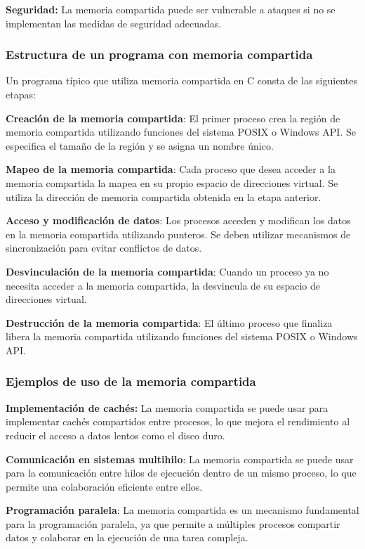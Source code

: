 \textbf{Seguridad:} La memoria compartida puede ser vulnerable a ataques si no se implementan las medidas de seguridad adecuadas.

\subsubsection{Estructura de un programa con memoria compartida}

Un programa típico que utiliza memoria compartida en C consta de las siguientes etapas:

\textbf{Creación de la memoria compartida}: El primer proceso crea la región de memoria compartida utilizando funciones del sistema POSIX o Windows API. Se especifica el tamaño de la región y se asigna un nombre único.

\textbf{Mapeo de la memoria compartida}: Cada proceso que desea acceder a la memoria compartida la mapea en su propio espacio de direcciones virtual. Se utiliza la dirección de memoria compartida obtenida en la etapa anterior.

\textbf{Acceso y modificación de datos}: Los procesos acceden y modifican los datos en la memoria compartida utilizando punteros. Se deben utilizar mecanismos de sincronización para evitar conflictos de datos.

\textbf{Desvinculación de la memoria compartida}: Cuando un proceso ya no necesita acceder a la memoria compartida, la desvincula de su espacio de direcciones virtual.

\textbf{Destrucción de la memoria compartida}: El último proceso que finaliza libera la memoria compartida utilizando funciones del sistema POSIX o Windows API.

\subsubsection{Ejemplos de uso de la memoria compartida}

\textbf{Implementación de cachés:} La memoria compartida se puede usar para implementar cachés compartidos entre procesos, lo que mejora el rendimiento al reducir el acceso a datos lentos como el disco duro.

\textbf{Comunicación en sistemas multihilo}: La memoria compartida se puede usar para la comunicación entre hilos de ejecución dentro de un mismo proceso, lo que permite una colaboración eficiente entre ellos.

\textbf{Programación paralela}: La memoria compartida es un mecanismo fundamental para la programación paralela, ya que permite a múltiples procesos compartir datos y colaborar en la ejecución de una tarea compleja.

